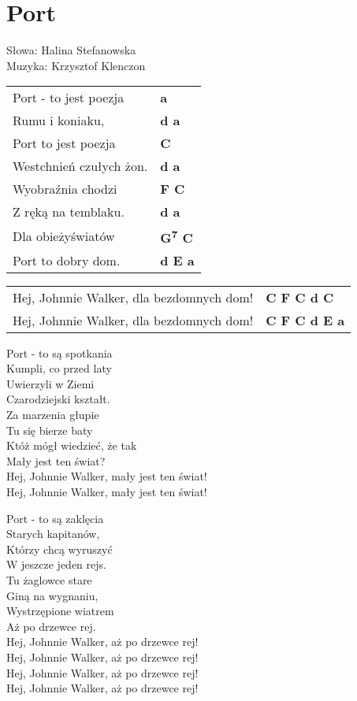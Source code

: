 \section{Port}

Słowa: Halina Stefanowska \\
Muzyka: Krzysztof Klenczon

\vspace{2em}
\begin{tabular}{@{}p{8cm}@{}l@{}}
Port - to jest poezja & \bfseries a \\
Rumu i koniaku, & \bfseries d a \\
Port to jest poezja & \bfseries C \\
Westchnień czułych żon. & \bfseries d a \\
Wyobraźnia chodzi & \bfseries F C \\
Z ręką na temblaku. & \bfseries d a \\
Dla obieżyświatów & \bfseries G\textsuperscript{7} C \\
Port to dobry dom. & \bfseries d E a \\
\end{tabular}

\vspace{1em}
\begin{tabular}{@{}p{8cm}@{}l@{}}
Hej, Johnnie Walker, dla bezdomnych dom! & \bfseries C F C d C \\
Hej, Johnnie Walker, dla bezdomnych dom! & \bfseries C F C d E a \\
\end{tabular}

\vspace{1em}
Port - to są spotkania \\
Kumpli, co przed laty \\
Uwierzyli w Ziemi \\
Czarodziejski kształt. \\
Za marzenia głupie \\
Tu się bierze baty \\
Któż mógł wiedzieć, że tak \\
Mały jest ten świat? \\

Hej, Johnnie Walker, mały jest ten świat! \\
Hej, Johnnie Walker, mały jest ten świat! \\
\newpage

Port - to są zaklęcia \\
Starych kapitanów, \\
Którzy chcą wyruszyć \\
W jeszcze jeden rejs. \\
Tu żaglowce stare \\
Giną na wygnaniu, \\
Wystrzępione wiatrem \\
Aż po drzewce rej. \\

Hej, Johnnie Walker, aż po drzewce rej! \\
Hej, Johnnie Walker, aż po drzewce rej! \\
Hej, Johnnie Walker, aż po drzewce rej! \\
Hej, Johnnie Walker, aż po drzewce rej! \\